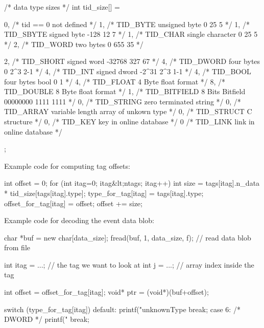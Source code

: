 \begin{DoxyCode}
/* data type sizes */
int tid_size[] = {
   0,                           /* tid == 0 not defined                          
           */
   1,                           /* TID_BYTE      unsigned byte         0       25
      5    */
   1,                           /* TID_SBYTE     signed byte         -128      12
      7    */
   1,                           /* TID_CHAR      single character      0       25
      5    */
   2,                           /* TID_WORD      two bytes             0      655
      35   */

   2,                           /* TID_SHORT     signed word        -32768    327
      67   */
   4,                           /* TID_DWORD     four bytes            0      2^3
      2-1  */
   4,                           /* TID_INT       signed dword        -2^31    2^3
      1-1  */
   4,                           /* TID_BOOL      four bytes bool       0        1
           */
   4,                           /* TID_FLOAT     4 Byte float format             
           */
   8,                           /* TID_DOUBLE    8 Byte float format             
           */
   1,                           /* TID_BITFIELD  8 Bits Bitfield    00000000 1111
      1111 */
   0,                           /* TID_STRING    zero terminated string          
           */
   0,                           /* TID_ARRAY     variable length array of unkown 
      type */
   0,                           /* TID_STRUCT    C structure                     
           */
   0,                           /* TID_KEY       key in online database          
           */
   0                            /* TID_LINK      link in online database         
           */

};
\end{DoxyCode}


Example code for computing tag offsets: 
\begin{DoxyCode}
int offset = 0;
for (int itag=0; itag&lt;ntags; itag++) {
   int size = tags[itag].n_data * tid_size[tags[itag].type];
   type_for_tag[itag] = tags[itag].type;
   offset_for_tag[itag] = offset;
   offset += size;
}
\end{DoxyCode}


Example code for decoding the event data blob: 
\begin{DoxyCode}
char *buf = new char[data_size];
fread(buf, 1, data_size, f); // read data blob from file

int itag = ...; // the tag we want to look at
int j    = ...; // array index inside the tag

int offset = offset_for_tag[itag];
void* ptr = (void*)(buf+offset);

switch (type_for_tag[itag]) {
   default:
      printf("unknownType%
      break;
   case 6: /* DWORD */
      printf("%
      break;
}
\end{DoxyCode}


